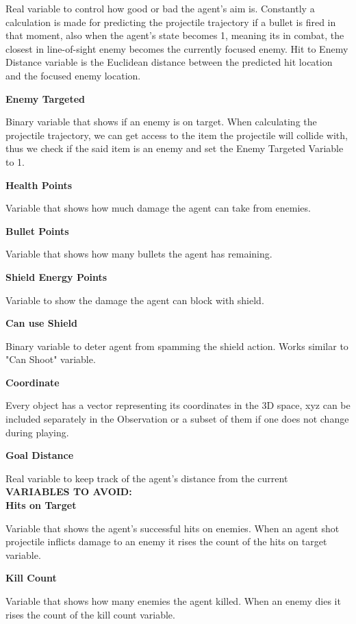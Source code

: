 \documentclass[a4paper,one side,12pt]{book}
\begin{document}
Real variable to control how good or bad the agent's aim is. Constantly
a calculation is made for predicting the projectile trajectory if a
bullet is fired in that moment, also when the agent's state becomes 1,
meaning its in combat, the closest in line-of-sight enemy becomes the
currently focused enemy. Hit to Enemy Distance variable is the Euclidean
distance between the predicted hit location and the focused enemy
location.

\textbf{Enemy Targeted}

Binary variable that shows if an enemy is on target. When calculating
the projectile trajectory, we can get access to the item the projectile
will collide with, thus we check if the said item is an enemy and set
the Enemy Targeted Variable to 1.

\textbf{Health Points}

Variable that shows how much damage the agent can take from enemies.

\textbf{Bullet Points}

Variable that shows how many bullets the agent has remaining.

\textbf{Shield Energy Points}

Variable to show the damage the agent can block with shield.

\textbf{Can use Shield}

Binary variable to deter agent from spamming the shield action. Works
similar to "Can Shoot" variable.

\textbf{Coordinate}

Every object has a vector representing its coordinates in the 3D space, 
xyz can be included separately in the Observation or a subset of them if one does not change during playing.

\textbf{Goal Distance}

Real variable to keep track of the agent's distance from the current\\

\textbf{VARIABLES TO AVOID:}\\

\textbf{Hits on Target}

Variable that shows the agent's successful hits on enemies. When an
agent shot projectile inflicts damage to an enemy it rises the count of
the hits on target variable.

\textbf{Kill Count}

Variable that shows how many enemies the agent killed. When an enemy
dies it rises the count of the kill count variable.
\end{document}
